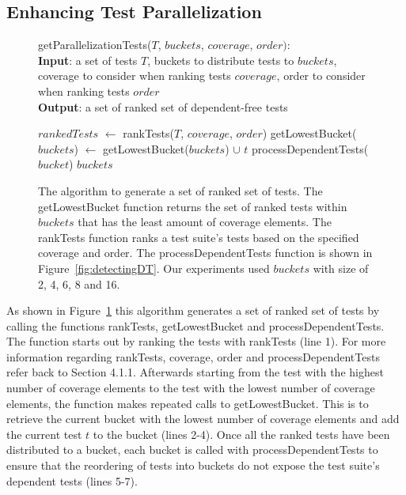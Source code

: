 \subsection{Enhancing Test Parallelization}
\begin{figure}[t]
	getParallelizationTests($\mathit{T}$, $\mathit{buckets}$, $\mathit{coverage}$, $\mathit{order}):$\\
	\textbf{Input}: a set of tests $\mathit{T}$, buckets to distribute tests to $\mathit{buckets}$, coverage to consider when ranking tests $\mathit{coverage}$, order to consider when ranking tests $\mathit{order}$\\
	\textbf{Output}: a set of ranked set of dependent-free tests\\
	 \begin{algorithmic}[1]
	 	\vspace{-5mm}
		\STATE $\mathit{rankedTests}$ $\leftarrow$ rankTests($\mathit{T}$, $\mathit{coverage}$, $\mathit{order}$)
			\STATE getLowestBucket($\mathit{buckets}$) $\leftarrow$ getLowestBucket($\mathit{buckets}$) $\cup$ $\mathit{t}$
		\ENDFOR
			\STATE processDependentTests($\mathit{bucket}$)
		\ENDFOR
		\RETURN $\mathit{buckets}$
	\end{algorithmic}
	\vspace{-3mm}
	\caption {
		The algorithm to generate a set of ranked set of tests. The getLowestBucket function returns the set of ranked tests within $\mathit{buckets}$ that has the least amount of coverage elements. The rankTests function ranks a test suite's tests based on the specified coverage and order. The processDependentTests function is shown in Figure~\ref{fig:detectingDT}. Our experiments used $\mathit{buckets}$ with size of 2, 4, 6, 8 and 16.
	}
	\label{fig:parallelization}
\end{figure}
As shown in Figure~\ref{fig:parallelization} this algorithm generates a set of ranked set of tests by calling the functions rankTests, getLowestBucket and processDependentTests. The function starts out by ranking the tests with rankTests (line 1). For more information regarding rankTests, coverage, order and processDependentTests refer back to Section 4.1.1. Afterwards starting from the test with the highest number of coverage elements to the test with the lowest number of coverage elements, the function makes repeated calls to getLowestBucket. This is to retrieve the current bucket with the lowest number of coverage elements and add the current test $\mathit{t}$ to the bucket (lines 2-4). Once all the ranked tests have been distributed to a bucket, each bucket is called with processDependentTests to ensure that the reordering of tests into buckets do not expose the test suite's dependent tests (lines 5-7). 
